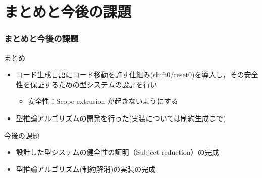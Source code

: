 \section{まとめと今後の課題}

\begin{frame}
  \frametitle{まとめと今後の課題}
  まとめ
  \begin{itemize}
  \item コード生成言語にコード移動を許す仕組み(shift0/reset0)を導入し，その安全性を保証するための型システムの設計を行い
    \begin{itemize}
    \item 安全性：Scope extrusion が起きないようにする
    \end{itemize}
  \item 型推論アルゴリズムの開発を行った(実装については制約生成まで)
  \end{itemize}

  \vspace{\baselineskip}

  今後の課題
  \begin{itemize}
  \item 設計した型システムの健全性の証明（Subject reduction）の完成
  \item 型推論アルゴリズム(制約解消)の実装の完成
  \end{itemize}
\end{frame}

